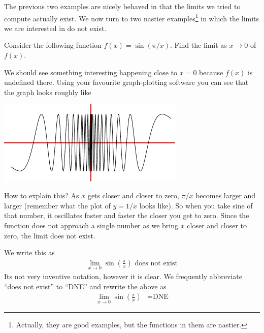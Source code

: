 The previous two examples are nicely behaved in that the limits we tried to
compute actually exist. We now turn to two nastier examples\footnote{Actually,
they are good examples, but the functions in them are nastier.} in which the
limits we are interested in do not exist.

\begin{eg}
\label{eg sinpix}
Consider the following function $f(x) = \sin( \pi /x )$. Find the limit as $x
\to 0$ of $f(x)$.

We should see something interesting happening close to $x=0$ because $f(x)$ is
undefined there. Using your favourite graph-plotting software you can see that
the graph looks roughly like
\begin{efig}
\begin{center}
 \includegraphics[height=4cm]{lim2}
\end{center}
\end{efig}
How to explain this? As $x$ gets closer and closer to zero, $\pi/x$ becomes
larger and larger (remember what the plot of $y=1/x$ looks like). So when you
take sine of that number, it oscillates faster and faster the closer you get to
zero. Since the function does not approach a single number as we bring $x$
closer and closer to zero, the limit does not exist.

We write this as
\begin{align*}
  \lim_{x\to 0} \sin \left(\frac{\pi}{x}\right) \text{ does not exist}
\end{align*}
Its not very inventive notation, however it is clear. We frequently
abbreviate ``does not exist'' to ``DNE'' and rewrite the above as
\begin{align*}
  \lim_{x\to 0} \sin \left(\frac{\pi}{x}\right) &= \text{DNE}
\end{align*}
\end{eg}

